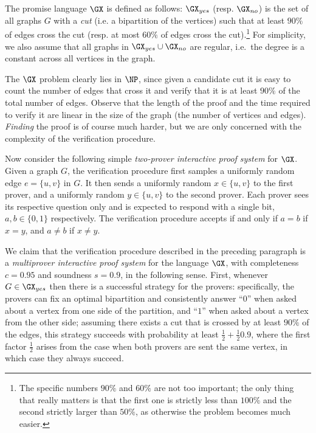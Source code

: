 The promise language $\GX$ is defined as follows: $\GX_{yes}$ (resp. $\GX_{no}$) is the set of all graphs $G$ with a \emph{cut} (i.e. a bipartition of the vertices) such that at least $90\%$ of edges cross the cut (resp. at most $60\%$ of edges cross the cut).\footnote{The specific numbers $90\%$ and $60\%$ are not too important; the only thing that really matters is that the first one is strictly less than $100\%$ and the second strictly larger than $50\%$, as otherwise the problem becomes much easier.} For simplicity, we also assume that all graphs in $\GX_{yes}\cup \GX_{no}$ are regular, i.e.\ the degree is a constant across all vertices in the graph. 

The $\GX$ problem clearly lies in $\NP$, since given a candidate cut it is easy to count the number of edges that cross it and verify that it is at least $90\%$ of the total number of edges. Observe that the length of the proof and the time required to verify it are linear in the size of the graph (the number of vertices and edges). \emph{Finding} the proof is of course much harder, but we are only concerned with the complexity of the verification procedure.

Now consider the following simple \emph{two-prover interactive proof system} for $\GX$. Given a graph $G$, the verification procedure first samples a uniformly random edge $e=\{u,v\}$ in $G$. It then sends a uniformly random $x\in\{u,v\}$ to the first prover, and a uniformly random $y\in \{u,v\}$ to the second prover. Each prover sees its respective question only and is expected to respond with a single bit, $a,b\in\{0,1\}$ respectively. The verification procedure accepts if and only if $a=b$ if $x=y$, and $a\neq b$ if $x\neq y$.

We claim that the verification procedure described in the preceding paragraph is a \emph{multiprover interactive proof system} for the language $\GX$, with completeness $c=0.95$ and soundness $s=0.9$, in the following sense. First, whenever $G\in \GX_{yes}$ then there is a successful strategy for the provers: specifically, the provers can fix an optimal bipartition and consistently answer ``$0$'' when asked about a vertex from one side of the partition, and ``$1$'' when asked about a vertex from the other side; assuming there exists a cut that is crossed by at least $90\%$ of the edges, this strategy succeeds with probability at least $\frac{1}{2} + \frac{1}{2}0.9$, where the first factor $\frac{1}{2}$ arises from the case when both provers are sent the same vertex, in which case they always succeed. 


